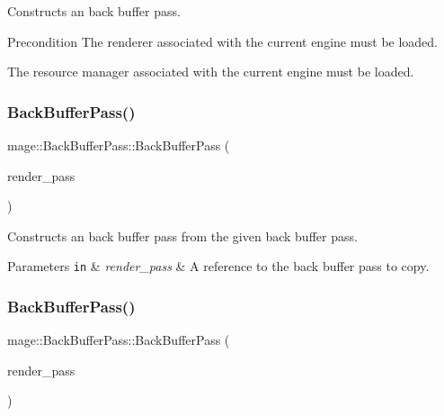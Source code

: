 Constructs an back buffer pass.

\begin{DoxyPrecond}{Precondition}
The renderer associated with the current engine must be loaded. 

The resource manager associated with the current engine must be loaded. 
\end{DoxyPrecond}
\hypertarget{classmage_1_1_back_buffer_pass_af69d8bb752a4e35d57ebd5afedaa097d}{}\label{classmage_1_1_back_buffer_pass_af69d8bb752a4e35d57ebd5afedaa097d} 
\subsubsection{\texorpdfstring{Back\+Buffer\+Pass()}{BackBufferPass()}\hspace{0.1cm}{\footnotesize\ttfamily [2/3]}}
{\footnotesize\ttfamily mage\+::\+Back\+Buffer\+Pass\+::\+Back\+Buffer\+Pass (\begin{DoxyParamCaption}\item[{const \hyperlink{classmage_1_1_back_buffer_pass}{Back\+Buffer\+Pass} \&}]{render\+\_\+pass }\end{DoxyParamCaption})\hspace{0.3cm}{\ttfamily [delete]}}

Constructs an back buffer pass from the given back buffer pass.


\begin{DoxyParams}[1]{Parameters}
\mbox{\tt in}  & {\em render\+\_\+pass} & A reference to the back buffer pass to copy. \\
\hline
\end{DoxyParams}
\hypertarget{classmage_1_1_back_buffer_pass_ad34af02ed3afeee917c3dd60f45d5493}{}\label{classmage_1_1_back_buffer_pass_ad34af02ed3afeee917c3dd60f45d5493} 
\subsubsection{\texorpdfstring{Back\+Buffer\+Pass()}{BackBufferPass()}\hspace{0.1cm}{\footnotesize\ttfamily [3/3]}}
{\footnotesize\ttfamily mage\+::\+Back\+Buffer\+Pass\+::\+Back\+Buffer\+Pass (\begin{DoxyParamCaption}\item[{\hyperlink{classmage_1_1_back_buffer_pass}{Back\+Buffer\+Pass} \&\&}]{render\+\_\+pass }\end{DoxyParamCaption})\hspace{0.3cm}{\ttfamily [default]}}

